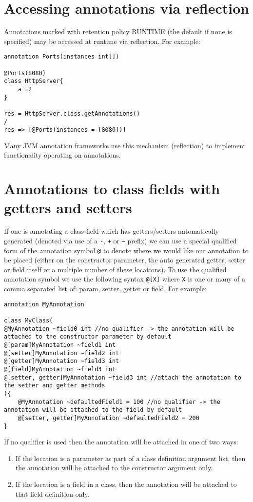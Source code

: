 \documentclass[conc-doc]{subfiles}
\begin{document}
\section{Accessing annotations via reflection}
Annotations marked with retention policy RUNTIME (the default if none is specified) may be accessed at runtime via reflection. For example:

\begin{lstlisting}
annotation Ports(instances int[])

@Ports(8080)
class HttpServer{
	a =2
}

res = HttpServer.class.getAnnotations()
/
res => [@Ports(instances = [8080])]
\end{lstlisting}

Many JVM annotation frameworks use this mechanism (reflection) to implement functionality operating on annotations.

\section{Annotations to class fields with getters and setters}
If one is annotating a class field which has getters/setters automatically generated (denoted via use of a \lstinline{-}, \lstinline{+} or \lstinline{~} prefix) we can use a special qualified form of the annotation symbol \lstinline{@} to denote where we would like our annotation to be placed (either on the constructor parameter, the auto generated getter, setter or field itself or a multiple number of these locations). To use the qualified annotation symbol we use the following syntax \lstinline{@[X]} where \lstinline{X} is one or many of a comma separated list of: param, setter, getter or field. For example:

\begin{lstlisting}
annotation MyAnnotation

class MyClass(
@MyAnnotation ~field0 int //no qualifier -> the annotation will be attached to the constructor parameter by default
@[param]MyAnnotation ~field1 int
@[setter]MyAnnotation ~field2 int
@[getter]MyAnnotation ~field3 int
@[field]MyAnnotation ~field3 int
@[setter, getter]MyAnnotation ~field3 int //attach the annotation to the setter and getter methods
){
	@MyAnnotation ~defaultedField1 = 100 //no qualifier -> the annotation will be attached to the field by default
	@[setter, getter]MyAnnotation ~defaultedField2 = 200 
}
\end{lstlisting}

If no qualifier is used then the annotation will be attached in one of two ways:
\begin{enumerate}
	\item If the location is a parameter as part of a class definition argument list, then the annotation will be attached to the constructor argument only.
	\item If the location is a field in a class, then the annotation will be attached to that field definition only.
\end{enumerate}
\end{document}
